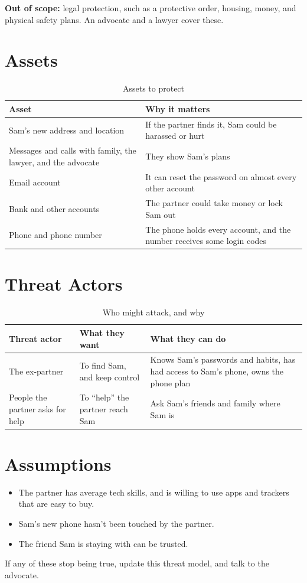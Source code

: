 \documentclass[11pt]{article}
\begin{document}
\textbf{Out of scope:} legal protection, such as a protective order, housing, money, and physical safety plans. An advocate and a lawyer cover these.

\section{Assets}
\begin{table}[H]
\caption{Assets to protect}
\begin{tabular}{|m{}|m{}|}
\hline
\textbf{Asset} & \textbf{Why it matters} \\
\hline
Sam's new address and location & If the partner finds it, Sam could be harassed or hurt \\
\hline
Messages and calls with family, the lawyer, and the advocate & They show Sam's plans \\
\hline
Email account & It can reset the password on almost every other account \\
\hline
Bank and other accounts & The partner could take money or lock Sam out \\
\hline
Phone and phone number & The phone holds every account, and the number receives some login codes
\end{tabular}
\end{table}

\section{Threat Actors}
\begin{table}[H]
\caption{Who might attack, and why}
\begin{tabular}{|m{}|m{}|m{}|}
\hline
\textbf{Threat actor} & \textbf{What they want} & \textbf{What they can do} \\
\hline
The ex-partner & To find Sam, and keep control & Knows Sam's passwords and habits, has had access to Sam's phone, owns the phone plan \\
\hline
People the partner asks for help & To ``help'' the partner reach Sam & Ask Sam's friends and family where Sam is
\end{tabular}
\end{table}

\section{Assumptions}
\begin{itemize}
    \item The partner has average tech skills, and is willing to use apps and trackers that are easy to buy.
    \item Sam's new phone hasn't been touched by the partner.
    \item The friend Sam is staying with can be trusted.
\end{itemize}
If any of these stop being true, update this threat model, and talk to the advocate.
\end{document}
